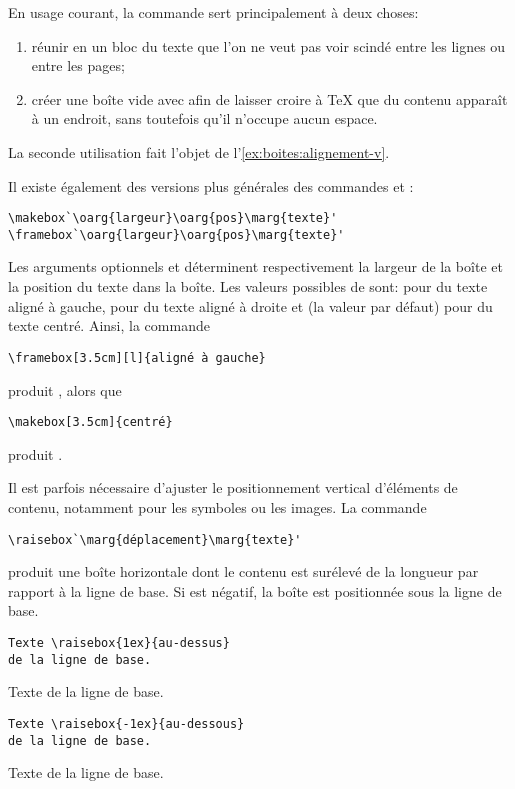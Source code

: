 \begin{conseil}
  En usage courant, la commande \cmd{\mbox} sert principalement à deux
  choses:
  \begin{enumerate}
  \item réunir en un bloc du texte que l'on ne veut pas voir scindé
    entre les lignes ou entre les pages;
  \item \label{item:boites:mbox} créer une boîte vide avec
     afin de laisser croire à {\TeX} que du contenu
    apparaît à un endroit, sans toutefois qu'il n'occupe aucun espace.
  \end{enumerate}
  La seconde utilisation fait l'objet de
  l'\autoref{ex:boites:alignement-v}.
\end{conseil}

Il existe également des versions plus générales des commandes
\cmd{\mbox} et \cmd{\fbox}:
\begin{lstlisting}
\makebox`\oarg{largeur}\oarg{pos}\marg{texte}'
\framebox`\oarg{largeur}\oarg{pos}\marg{texte}'
\end{lstlisting}
Les arguments optionnels  et  déterminent
respectivement la largeur de la boîte et la position du texte
dans la boîte. Les valeurs possibles de  sont:  pour
du texte aligné à gauche,  pour du texte aligné à droite et
 (la valeur par défaut) pour du texte centré. Ainsi, la commande
\begin{lstlisting}
\framebox[3.5cm][l]{aligné à gauche}
\end{lstlisting}
produit , alors que
\begin{lstlisting}
\makebox[3.5cm]{centré}
\end{lstlisting}
produit .

Il est parfois nécessaire d'ajuster le positionnement vertical
d'éléments de contenu, notamment pour les symboles ou les images. La
commande
\begin{lstlisting}
\raisebox`\marg{déplacement}\marg{texte}'
\end{lstlisting}
produit une boîte horizontale dont le contenu  est
surélevé de la longueur  par rapport à la ligne de
base. Si  est négatif, la boîte est positionnée sous
la ligne de base.
\begin{demo}
  \begin{texample}[0.55\textwidth]
\begin{lstlisting}
Texte \raisebox{1ex}{au-dessus}
de la ligne de base.
\end{lstlisting}
    \producing
    Texte \raisebox{1ex}{au-dessus}
    de la ligne de base.
  \end{texample}

  \begin{texample}[0.55\textwidth]
\begin{lstlisting}
Texte \raisebox{-1ex}{au-dessous}
de la ligne de base.
\end{lstlisting}
    \producing
    Texte \raisebox{-1ex}{au-dessous}
    de la ligne de base.
  \end{texample}
\end{demo}

